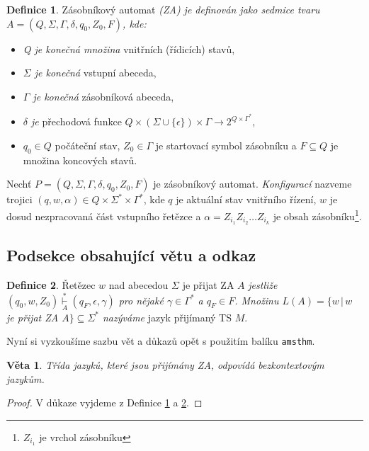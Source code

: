 \documentclass[11pt, a4paper]{article}
\newtheorem{theorem}{Věta}
\theoremstyle{definition}
\newtheorem{definition}{Definice}
\begin{document}
\begin{definition}
\label{def1}
Zásobníkový automat \textit{(ZA) je definován jako sedmice tvaru $A= (Q,\Sigma,\Gamma,\delta,q_0,Z_0,F)$, kde:}
\begin{itemize}
    \item \textit{Q je konečná množina} vnitřních (řídicích) stavů,
    \item \textit{$\Sigma$ je konečná} vstupní abeceda,
    \item \textit{$\Gamma$ je konečná} zásobníková abeceda,
    \item \textit{$\delta$ je} přechodová funkce $Q\times(\Sigma\cup\{\epsilon\})\times\Gamma\rightarrow 2^{Q\times\Gamma^*}$,
    \item $q_0\in Q$ počáteční stav, $Z_0\in\Gamma$ je startovací symbol zásobníku a $F\subseteq Q$ je množina koncových stavů.
\end{itemize}

Nechť $P=(Q,\Sigma,\Gamma,\delta,q_0,Z_0,F)$ je zásobníkový auto\-mat. \textit{Konfigurací} nazveme trojici $(q,w,\alpha)\in Q\times\Sigma^*\times\Gamma^*$, kde $q$ je aktuální stav vnitřního řízení, $w$ je dosud nezpra\-covaná část vstupního řetězce a $\alpha=Z_{i_1}Z_{i_2}\ldots Z_{i_k}$ je obsah zásobníku\footnote{$Z_{i_1}$ je vrchol zásobníku}.

\end{definition}

\subsection{Podsekce obsahující větu a odkaz}

\begin{definition}
\label{def2}
Řetězec $w$ nad abecedou $\Sigma$ je přijat ZA $A$ \textit{jestliže $(q_0,w,Z_0) \underset{A}{\overset{*}{\vdash}} (q_F,\epsilon,\gamma)$ pro nějaké $\gamma\in\Gamma^*$ a $q_F\in F$. Množinu $L(A)=\{w\,|\, w$ je přijat ZA $A\}\subseteq \Sigma^*$ nazýváme} jazyk přijímaný TS $M$.
\end{definition}

Nyní si vyzkoušíme sazbu vět a důkazů opět s použitím balíku \verb|amsthm|.

\begin{theorem}
Třída jazyků, které jsou přijímány ZA, odpovídá bezkontextovým jazykům.
\end{theorem}

\begin{proof}
V důkaze vyjdeme z Definice \ref{def1} a \ref{def2}.
\end{proof}
\end{document}

